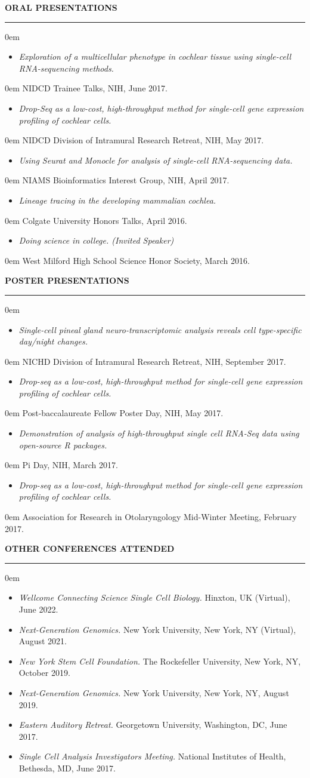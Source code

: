 \documentclass[10pt, letterpaper]{article} %
\newenvironment{CVSection}{
\begin{addmargin}[2em]{0em}
\begin{samepage}}
{\end{samepage}
\end{addmargin}\bigskip}
\newcommand{\CVList}[2]{
\begin{samepage}
\begin{itemize}[leftmargin=*]
\item \textsl{#1}
\end{itemize}
\begin{addmargin}[2.5em]{0em}
#2
\end{addmargin}
\end{samepage}
}
\newcommand{\CVListOneLine}[2]{
\begin{samepage}
\begin{itemize}[leftmargin=*]
\item \textsl{#1} \textnormal{#2}
\end{itemize}
\end{samepage}
}
\newcommand{\CVHeading}[1]{
\MakeUppercase{\bf #1}
\smallskip
\hrule
\medskip
}
\begin{document}
\CVHeading{Oral Presentations}
\begin{CVSection}
\CVList{Exploration of a multicellular phenotype in cochlear tissue using single-cell RNA-sequencing methods.}{NIDCD Trainee Talks, NIH, June 2017.}
\CVList{Drop-Seq as a low-cost, high-throughput method for single-cell gene expression profiling of cochlear cells.}{NIDCD Division of Intramural Research Retreat, NIH, May 2017.}
\CVList{Using Seurat and Monocle for analysis of single-cell RNA-sequencing data.}{NIAMS Bioinformatics Interest Group, NIH, April 2017.}
\CVList{Lineage tracing in the developing mammalian cochlea.}{Colgate University Honors Talks, April 2016.}
\CVList{Doing science in college. \textnormal{(Invited Speaker)}}{West Milford High School Science Honor Society, March 2016.}
\end{CVSection}

\CVHeading{Poster Presentations}
\begin{CVSection}
\CVList{Single-cell pineal gland neuro-transcriptomic analysis reveals cell type-specific day/night changes.}{NICHD Division of Intramural Research Retreat, NIH, September 2017.}
\CVList{Drop-seq as a low-cost, high-throughput method for single-cell gene expression profiling of cochlear cells.}{Post-baccalaureate Fellow Poster Day, NIH, May 2017.}
\CVList{Demonstration of analysis of high-throughput single cell RNA-Seq data using open-source R packages.}{Pi Day, NIH, March 2017.}
\CVList{Drop-seq as a low-cost, high-throughput method for single-cell gene expression profiling of cochlear cells.}{Association for Research in Otolaryngology Mid-Winter Meeting, February 2017.}
\end{CVSection}

\CVHeading{Other Conferences Attended}
\begin{CVSection}
\CVListOneLine{Wellcome Connecting Science Single Cell Biology.}{Hinxton, UK (Virtual), June 2022.}
\CVListOneLine{Next-Generation Genomics.}{New York University, New York, NY (Virtual), August 2021.}
\CVListOneLine{New York Stem Cell Foundation.}{The Rockefeller University, New York, NY, October 2019.}
\CVListOneLine{Next-Generation Genomics.}{New York University, New York, NY, August 2019.}
\CVListOneLine{Eastern Auditory Retreat.}{Georgetown University, Washington, DC, June 2017.}
\CVListOneLine{Single Cell Analysis Investigators Meeting.}{National Institutes of Health, Bethesda, MD, June 2017.}
\end{CVSection}
\end{document}
